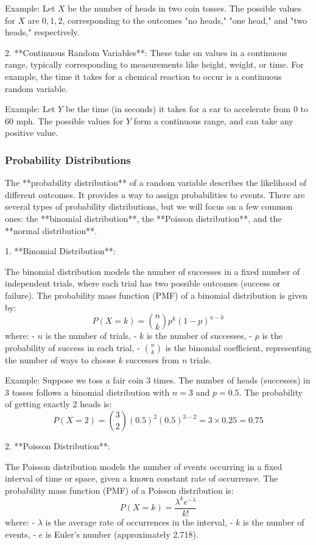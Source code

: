 \documentclass{article}
\begin{document}
   Example: Let \( X \) be the number of heads in two coin tosses. The possible values for \( X \) are \( 0, 1, 2 \), corresponding to the outcomes "no heads," "one head," and "two heads," respectively.

2. **Continuous Random Variables**: These take on values in a continuous range, typically corresponding to measurements like height, weight, or time. For example, the time it takes for a chemical reaction to occur is a continuous random variable.

   Example: Let \( Y \) be the time (in seconds) it takes for a car to accelerate from 0 to 60 mph. The possible values for \( Y \) form a continuous range, and can take any positive value.

\subsubsection*{Probability Distributions}

The **probability distribution** of a random variable describes the likelihood of different outcomes. It provides a way to assign probabilities to events. There are several types of probability distributions, but we will focus on a few common ones: the **binomial distribution**, the **Poisson distribution**, and the **normal distribution**.

1. **Binomial Distribution**:

   The binomial distribution models the number of successes in a fixed number of independent trials, where each trial has two possible outcomes (success or failure). The probability mass function (PMF) of a binomial distribution is given by:
   \[
   P(X = k) = \binom{n}{k} p^k (1 - p)^{n-k}
   \]
   where:
   - \( n \) is the number of trials,
   - \( k \) is the number of successes,
   - \( p \) is the probability of success in each trial,
   - \( \binom{n}{k} \) is the binomial coefficient, representing the number of ways to choose \( k \) successes from \( n \) trials.

   Example: Suppose we toss a fair coin 3 times. The number of heads (successes) in 3 tosses follows a binomial distribution with \( n = 3 \) and \( p = 0.5 \). The probability of getting exactly 2 heads is:
   \[
   P(X = 2) = \binom{3}{2} (0.5)^2 (0.5)^{3-2} = 3 \times 0.25 = 0.75
   \]

2. **Poisson Distribution**:

   The Poisson distribution models the number of events occurring in a fixed interval of time or space, given a known constant rate of occurrence. The probability mass function (PMF) of a Poisson distribution is:
   \[
   P(X = k) = \frac{\lambda^k e^{-\lambda}}{k!}
   \]
   where:
   - \( \lambda \) is the average rate of occurrences in the interval,
   - \( k \) is the number of events,
   - \( e \) is Euler’s number (approximately 2.718).
\end{document}
